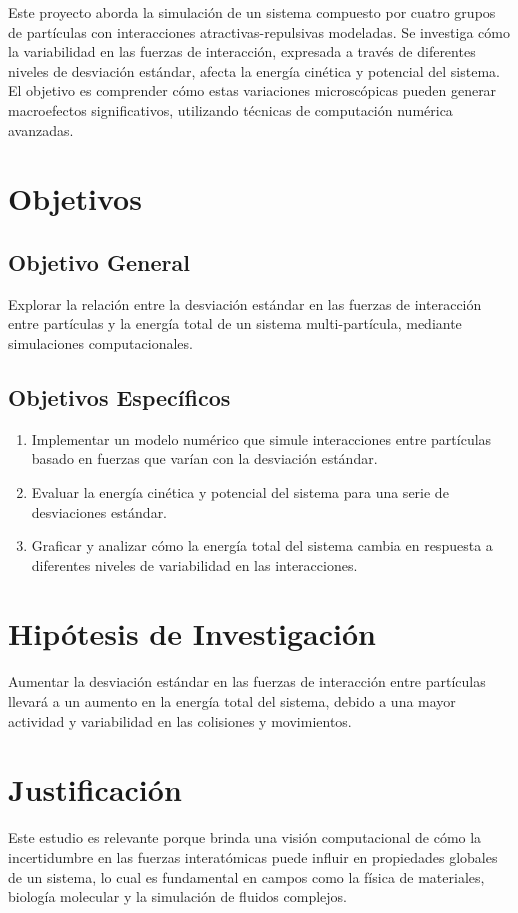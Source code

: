 Este proyecto aborda la simulación de un sistema compuesto por cuatro grupos de partículas con interacciones atractivas-repulsivas modeladas. Se investiga cómo la variabilidad en las fuerzas de interacción, expresada a través de diferentes niveles de desviación estándar, afecta la energía cinética y potencial del sistema. El objetivo es comprender cómo estas variaciones microscópicas pueden generar macroefectos significativos, utilizando técnicas de computación numérica avanzadas.

\section{Objetivos}

\subsection{Objetivo General}
Explorar la relación entre la desviación estándar en las fuerzas de interacción entre partículas y la energía total de un sistema multi-partícula, mediante simulaciones computacionales.

\subsection{Objetivos Específicos}
\begin{enumerate}
\item Implementar un modelo numérico que simule interacciones entre partículas basado en fuerzas que varían con la desviación estándar.
\item Evaluar la energía cinética y potencial del sistema para una serie de desviaciones estándar.
\item Graficar y analizar cómo la energía total del sistema cambia en respuesta a diferentes niveles de variabilidad en las interacciones.
\end{enumerate}

\section{Hipótesis de Investigación}
Aumentar la desviación estándar en las fuerzas de interacción entre partículas llevará a un aumento en la energía total del sistema, debido a una mayor actividad y variabilidad en las colisiones y movimientos.

\section{Justificación}
Este estudio es relevante porque brinda una visión computacional de cómo la incertidumbre en las fuerzas interatómicas puede influir en propiedades globales de un sistema, lo cual es fundamental en campos como la física de materiales, biología molecular y la simulación de fluidos complejos.

